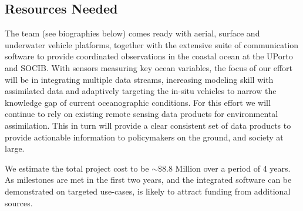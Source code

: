\subsection{Resources Needed}

The \pro team (see biographies below) comes ready with aerial, surface
and underwater vehicle platforms, together with the extensive suite of
communication software to provide coordinated observations in the
coastal ocean at the UPorto and SOCIB. With sensors measuring key
ocean variables, the focus of our effort will be in integrating
multiple data streams, increasing modeling skill with assimilated data
and adaptively targeting the in-situ vehicles to narrow the knowledge
gap of current oceanographic conditions. For this effort we will
continue to rely on existing remote sensing data products for
environmental assimilation. This in turn will provide a clear
consistent set of data products to provide actionable information to
policymakers on the ground, and society at large.


We estimate the total project cost to be $\sim\$8.8$ Million over a
period of 4 years. As milestones are met in the first two years, and
the integrated software can be demonstrated on targeted use-cases,
\pro is likely to attract funding from additional sources.




